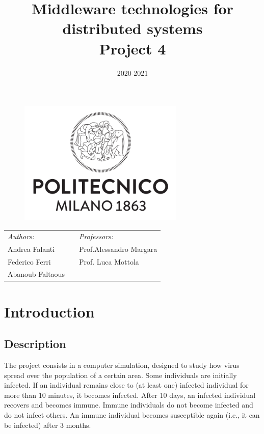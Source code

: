 \documentclass[10pt]{article}
\title{Middleware technologies for distributed systems\\Project 4}
\date{2020-2021}
\begin{document}
	\begin{titlepage}
		\begin{figure}[t]
			\centering\includegraphics[width=0.7\textwidth]{../../docResources/logo_polimi}
		\end{figure}
		\maketitle
		
		\large
		\begin{tabularx}{\linewidth}{@{}lXl@{}}
			\textit{Authors:}  & & \textit{Professors:} \\
			Andrea Falanti      & & Prof.\@ Alessandro Margara\\
			Federico Ferri  & & Prof. Luca Mottola \\
			Abanoub Faltaous & & \\
		\end{tabularx}		
		\thispagestyle{empty}
	\end{titlepage}
	
	\tableofcontents
	\newpage
	
	\section{Introduction}
	\subsection{Description}
	The project consists in a computer simulation, designed to study how virus spread over the population of a certain area. Some individuals are initially infected. If an individual remains close to (at least one) infected individual for more than 10 minutes, it becomes infected. After 10 days, an infected individual recovers and becomes immune. Immune individuals do not become infected and do not infect others. An immune individual becomes susceptible again (i.e., it can be infected) after 3 months.
	
\end{document}
